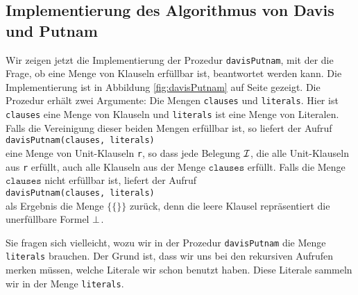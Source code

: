 \subsection{Implementierung des Algorithmus von Davis und Putnam}
Wir zeigen jetzt die Implementierung der Prozedur \texttt{davisPutnam}, 
mit der die Frage, ob eine Menge von Klauseln erf\"{u}llbar ist, beantwortet werden kann. Die
Implementierung ist in Abbildung \ref{fig:davisPutnam} auf Seite \pageref{fig:davisPutnam}
gezeigt.  Die Prozedur erh\"{a}lt zwei Argumente: Die Mengen \texttt{clauses} und \texttt{literals}.
Hier ist \texttt{clauses} eine Menge von Klauseln und \texttt{literals} ist eine Menge von
Literalen.  Falls  die Vereinigung dieser beiden Mengen erf\"{u}llbar ist, so liefert
der Aufruf 
\\[0.2cm]
\hspace*{1.3cm}
\texttt{davisPutnam(clauses, literals)} 
\\[0.2cm]
eine Menge von Unit-Klauseln \texttt{r}, so
dass jede Belegung $\mathcal{I}$, die alle Unit-Klauseln aus \texttt{r} erf\"{u}llt, auch alle Klauseln aus
der Menge  $\mathtt{clauses}$ erf\"{u}llt.  Falls die Menge $\mathtt{clauses}$ nicht erf\"{u}llbar ist, liefert der Aufruf
\\[0.2cm]
\hspace*{1.3cm}
\texttt{davisPutnam(clauses, literals)} 
\\[0.2cm]
als Ergebnis die Menge $\bigl\{ \{\} \bigr\}$ zur\"{u}ck,
denn die leere Klausel repr\"{a}sentiert die unerf\"{u}llbare Formel $\bot$.

Sie fragen sich vielleicht, wozu wir in der Prozedur \texttt{davisPutnam} die Menge
\texttt{literals} brauchen.  Der Grund ist, dass wir uns bei den rekursiven Aufrufen
merken m\"{u}ssen, welche Literale wir schon benutzt haben.  Diese Literale sammeln wir in der
Menge \texttt{literals}.

